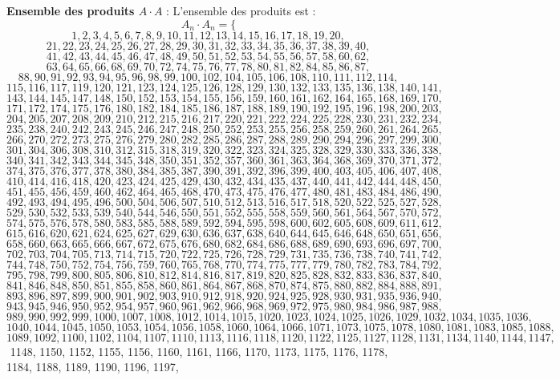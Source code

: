 \documentclass[11pt,a4paper]{article}
\begin{document}
\textbf{Ensemble des produits $A \cdot A$} :
L'ensemble des produits est :
$$ A_{{{n}}} \cdot A_{{{n}}} = \{ $$$$ 1, 2, 3, 4, 5, 6, 7, 8, 9, 10, 11, 12, 13, 14, 15, 16, 17, 18, 19, 20, $$$$ 21, 22, 23, 24, 25, 26, 27, 28, 29, 30, 31, 32, 33, 34, 35, 36, 37, 38, 39, 40, $$$$ 41, 42, 43, 44, 45, 46, 47, 48, 49, 50, 51, 52, 53, 54, 55, 56, 57, 58, 60, 62, $$$$ 63, 64, 65, 66, 68, 69, 70, 72, 74, 75, 76, 77, 78, 80, 81, 82, 84, 85, 86, 87, $$$$ 88, 90, 91, 92, 93, 94, 95, 96, 98, 99, 100, 102, 104, 105, 106, 108, 110, 111, 112, 114, $$$$ 115, 116, 117, 119, 120, 121, 123, 124, 125, 126, 128, 129, 130, 132, 133, 135, 136, 138, 140, 141, $$$$ 143, 144, 145, 147, 148, 150, 152, 153, 154, 155, 156, 159, 160, 161, 162, 164, 165, 168, 169, 170, $$$$ 171, 172, 174, 175, 176, 180, 182, 184, 185, 186, 187, 188, 189, 190, 192, 195, 196, 198, 200, 203, $$$$ 204, 205, 207, 208, 209, 210, 212, 215, 216, 217, 220, 221, 222, 224, 225, 228, 230, 231, 232, 234, $$$$ 235, 238, 240, 242, 243, 245, 246, 247, 248, 250, 252, 253, 255, 256, 258, 259, 260, 261, 264, 265, $$$$ 266, 270, 272, 273, 275, 276, 279, 280, 282, 285, 286, 287, 288, 289, 290, 294, 296, 297, 299, 300, $$$$ 301, 304, 306, 308, 310, 312, 315, 318, 319, 320, 322, 323, 324, 325, 328, 329, 330, 333, 336, 338, $$$$ 340, 341, 342, 343, 344, 345, 348, 350, 351, 352, 357, 360, 361, 363, 364, 368, 369, 370, 371, 372, $$$$ 374, 375, 376, 377, 378, 380, 384, 385, 387, 390, 391, 392, 396, 399, 400, 403, 405, 406, 407, 408, $$$$ 410, 414, 416, 418, 420, 423, 424, 425, 429, 430, 432, 434, 435, 437, 440, 441, 442, 444, 448, 450, $$$$ 451, 455, 456, 459, 460, 462, 464, 465, 468, 470, 473, 475, 476, 477, 480, 481, 483, 484, 486, 490, $$$$ 492, 493, 494, 495, 496, 500, 504, 506, 507, 510, 512, 513, 516, 517, 518, 520, 522, 525, 527, 528, $$$$ 529, 530, 532, 533, 539, 540, 544, 546, 550, 551, 552, 555, 558, 559, 560, 561, 564, 567, 570, 572, $$$$ 574, 575, 576, 578, 580, 583, 585, 588, 589, 592, 594, 595, 598, 600, 602, 605, 608, 609, 611, 612, $$$$ 615, 616, 620, 621, 624, 625, 627, 629, 630, 636, 637, 638, 640, 644, 645, 646, 648, 650, 651, 656, $$$$ 658, 660, 663, 665, 666, 667, 672, 675, 676, 680, 682, 684, 686, 688, 689, 690, 693, 696, 697, 700, $$$$ 702, 703, 704, 705, 713, 714, 715, 720, 722, 725, 726, 728, 729, 731, 735, 736, 738, 740, 741, 742, $$$$ 744, 748, 750, 752, 754, 756, 759, 760, 765, 768, 770, 774, 775, 777, 779, 780, 782, 783, 784, 792, $$$$ 795, 798, 799, 800, 805, 806, 810, 812, 814, 816, 817, 819, 820, 825, 828, 832, 833, 836, 837, 840, $$$$ 841, 846, 848, 850, 851, 855, 858, 860, 861, 864, 867, 868, 870, 874, 875, 880, 882, 884, 888, 891, $$$$ 893, 896, 897, 899, 900, 901, 902, 903, 910, 912, 918, 920, 924, 925, 928, 930, 931, 935, 936, 940, $$$$ 943, 945, 946, 950, 952, 954, 957, 960, 961, 962, 966, 968, 969, 972, 975, 980, 984, 986, 987, 988, $$$$ 989, 990, 992, 999, 1000, 1007, 1008, 1012, 1014, 1015, 1020, 1023, 1024, 1025, 1026, 1029, 1032, 1034, 1035, 1036, $$$$ 1040, 1044, 1045, 1050, 1053, 1054, 1056, 1058, 1060, 1064, 1066, 1071, 1073, 1075, 1078, 1080, 1081, 1083, 1085, 1088, $$$$ 1089, 1092, 1100, 1102, 1104, 1107, 1110, 1113, 1116, 1118, 1120, 1122, 1125, 1127, 1128, 1131, 1134, 1140, 1144, 1147, $$$$ 1148, 1150, 1152, 1155, 1156, 1160, 1161, 1166, 1170, 1173, 1175, 1176, 1178, 1184, 1188, 1189, 1190, 1196, 1197, 
\end{document}

